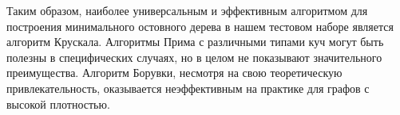 \documentclass[12pt,a4paper]{article}
\begin{document}
Таким образом, наиболее универсальным и эффективным алгоритмом для построения минимального остовного дерева в нашем тестовом наборе является алгоритм Крускала. Алгоритмы Прима с различными типами куч могут быть полезны в специфических случаях, но в целом не показывают значительного преимущества. Алгоритм Борувки, несмотря на свою теоретическую привлекательность, оказывается неэффективным на практике для графов с высокой плотностью.
\end{document}
